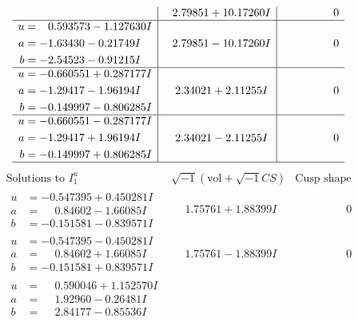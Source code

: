 \documentclass[1p]{elsarticle_modified}
\theoremstyle{definition}
\newcommand{\I}{\sqrt{-1}}
\begin{document}
$$\begin{array}{c|c|c}
 & \phantom{-}2.79851 + 10.17260 I & \phantom{-0.000000 } 0 \\ \hline\begin{aligned}
u &= \phantom{-}0.593573 - 1.127630 I \\
a &= -1.63430 - 0.21749 I \\
b &= -2.54523 - 0.91215 I\end{aligned}
 & \phantom{-}2.79851 - 10.17260 I & \phantom{-0.000000 } 0 \\ \hline\begin{aligned}
u &= -0.660551 + 0.287177 I \\
a &= -1.29417 - 1.96194 I \\
b &= -0.149997 - 0.806285 I\end{aligned}
 & \phantom{-}2.34021 + 2.11255 I & \phantom{-0.000000 } 0 \\ \hline\begin{aligned}
u &= -0.660551 - 0.287177 I \\
a &= -1.29417 + 1.96194 I \\
b &= -0.149997 + 0.806285 I\end{aligned}
 & \phantom{-}2.34021 - 2.11255 I & \phantom{-0.000000 } 0\\
 \hline 
 \end{array}$$\newpage$$\begin{array}{c|c|c}  
\text{Solutions to }I^u_{1}& \I (\text{vol} + \sqrt{-1}CS) & \text{Cusp shape}\\
 \hline 
\begin{aligned}
u &= -0.547395 + 0.450281 I \\
a &= \phantom{-}0.84602 - 1.66085 I \\
b &= -0.151581 - 0.839571 I\end{aligned}
 & \phantom{-}1.75761 + 1.88399 I & \phantom{-0.000000 } 0 \\ \hline\begin{aligned}
u &= -0.547395 - 0.450281 I \\
a &= \phantom{-}0.84602 + 1.66085 I \\
b &= -0.151581 + 0.839571 I\end{aligned}
 & \phantom{-}1.75761 - 1.88399 I & \phantom{-0.000000 } 0 \\ \hline\begin{aligned}
u &= \phantom{-}0.590046 + 1.152570 I \\
a &= \phantom{-}1.92960 - 0.26481 I \\
b &= \phantom{-}2.84177 - 0.85536 I\end{aligned}

\end{array}$$
\end{document}
